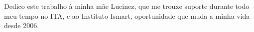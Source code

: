 \vspace*{18cm}

\begin{flushright}
\begin{minipage}[t]{7.0 cm}
Dedico este trabalho à minha mãe Lucinez, que me trouxe suporte durante todo meu tempo no ITA, e ao Instituto Ismart, oportunidade que muda a minha vida desde 2006.
\end{minipage}
\end{flushright}
